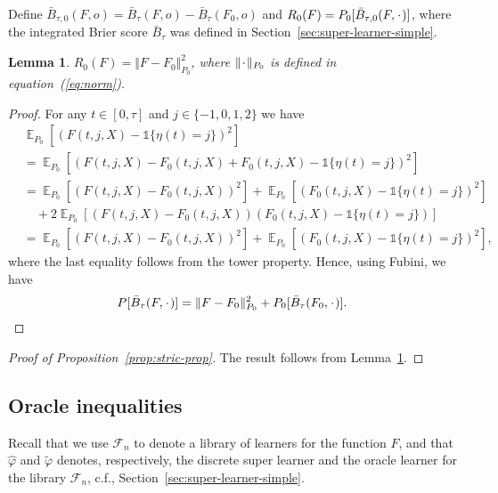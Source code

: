 \documentclass[11pt]{article}
\theoremstyle{thmstyleone}%
\newtheorem{lemma}{Lemma}
\theoremstyle{thmstyletwo}%
\theoremstyle{thmstylethree}%
\DeclareMathOperator{\E}{\mathbb{E}} %
\newcommand{\blank}{\makebox[1ex]{\textbf{$\cdot$}}}
\renewcommand{\phi}{\varphi}
\newcommand{\1}{\mathds{1}}
\begin{document}
Define
\( \bar{B}_{\tau,0}(F, o) = \bar{B}_{\tau}(F, o) - \bar{B}_{\tau}(F_0, o) \) and
\( R_{0}(F) = P_0{[\bar{B}_{\tau,0}(F, \blank)]} \), where the integrated Brier
score \( \bar{B}_{\tau} \) was defined in
Section~\ref{sec:super-learner-simple}.
\begin{lemma}
  \label{lemma:norm}
  \( R_{0}(F) = \Vert F - F_0 \Vert_{P_0}^2 \), where \( \Vert \blank \Vert_{P_0}\) is defined
  in equation~(\ref{eq:norm}).
\end{lemma}
\begin{proof}[Proof]
  For any \( t \in [0, \tau] \) and \( j\in \{-1,0,1,2\} \) we have
  \begin{align*}
    & \E_{P_0}{\left[ (F(t, j, X) - \1{\{\eta(t) = j \}})^2 \right]}
    \\
    & =    \E_{P_0}{\left[ (F(t, j, X) - F_0(t, j, X) + F_0(t, j, X) - \1{\{\eta(t) = j
      \}})^2 \right]}
    \\
    & =    \E_{P_0}{\left[ (F(t, j, X) - F_0(t, j, X))^2\right]}
      + \E_{P_0}{\left[ (F_0(t, j, X) - \1{\{\eta(t) = j \}})^2\right]}
    \\
    & \quad
      + 2\E_{P_0}{\left[ (F(t, j, X) - F_0(t, j, X))(F_0(t, j, X) - \1{\{\eta(t) = j
      \}})\right]}
    \\
    & =    \E_{P_0}{\left[ (F(t, j, X) - F_0(t, j, X))^2\right]}
      + \E_{P_0}{\left[ (F_0(t, j, X) - \1{\{\eta(t) = j \}})^2\right]},
  \end{align*}
  where the last equality follows from the tower property. Hence, using Fubini,
  we have
  \begin{equation*}
    P{[\bar{B}_{\tau}(F, \blank)]}
    = \Vert F - F_0 \Vert_{P_0}^2 + P_0{[\bar{B}_{\tau}(F_0, \blank)]}.
  \end{equation*}
\end{proof}

\begin{proof}[Proof of Proposition~\ref{prop:stric-prop}]
  The result follows from Lemma~\ref{lemma:norm}.
\end{proof}

\subsection{Oracle inequalities}
\label{sec:oracle-inequalities}

Recall that we use \( \mathcal{F}_n \) to denote a library of learners for the
function \( F \), and that \( \hat{\phi} \) and \( \tilde{\phi} \) denotes,
respectively, the discrete super learner and the oracle learner for the library
\( \mathcal{F}_n \), c.f., Section~\ref{sec:super-learner-simple}.
\end{document}
